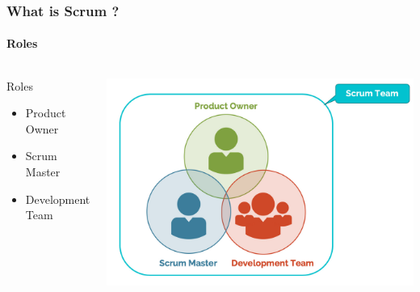 \documentclass{beamer}
\begin{document}
\begin{frame}
	\frametitle{What is Scrum ?}
	
	\framesubtitle{Roles}
	\begin{columns}
	    \begin{block}{Roles}
		\begin{itemize}
		    \item Product Owner
		    
		    \item Scrum Master
		    
		    \item Development Team
		\end{itemize}
	    \end{block}
	
	
	    
    
	    \includegraphics[width=1\textwidth]{Images/roles.jpg}   
    
	\end{columns}	
\end{frame}
    
\end{document}
